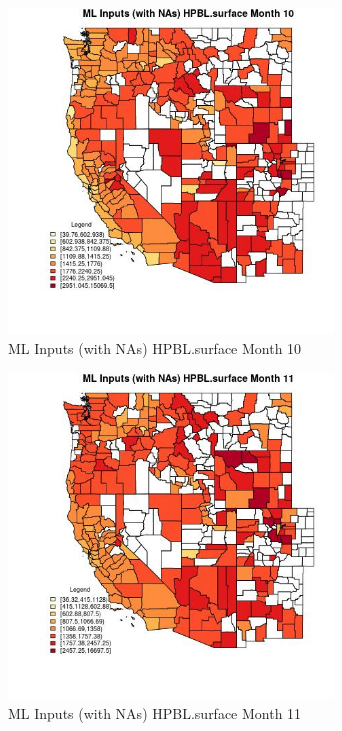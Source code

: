 \begin{figure} 
\centering  
\includegraphics[width=0.77\textwidth]{Code_Outputs/Report_ML_input_PM25_Step4_part_f_de_duplicated_aves_prioritize_24hr_obswNAs_CountyHPBLsurfacemedianMonth10.jpg} 
\caption{\label{fig:Report_ML_input_PM25_Step4_part_f_de_duplicated_aves_prioritize_24hr_obswNAsCountyHPBLsurfacemedianMonth10}ML Inputs (with NAs) HPBL.surface Month 10} 
\end{figure} 
 

\begin{figure} 
\centering  
\includegraphics[width=0.77\textwidth]{Code_Outputs/Report_ML_input_PM25_Step4_part_f_de_duplicated_aves_prioritize_24hr_obswNAs_CountyHPBLsurfacemedianMonth11.jpg} 
\caption{\label{fig:Report_ML_input_PM25_Step4_part_f_de_duplicated_aves_prioritize_24hr_obswNAsCountyHPBLsurfacemedianMonth11}ML Inputs (with NAs) HPBL.surface Month 11} 
\end{figure} 
 

